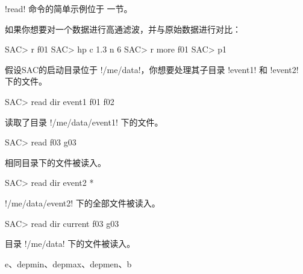!read! 命令的简单示例位于 一节。

如果你想要对一个数据进行高通滤波，并与原始数据进行对比：
\begin{SACCode}
SAC> r f01
SAC> hp c 1.3 n 6
SAC> r more f01
SAC> p1
\end{SACCode}

假设SAC的启动目录位于 !/me/data!，你想要处理其子目录 !event1!
和 !event2! 下的文件。
\begin{SACCode}
SAC> read dir event1 f01 f02
\end{SACCode}
读取了目录 !/me/data/event1! 下的文件。

\begin{SACCode}
SAC> read f03 g03
\end{SACCode}
相同目录下的文件被读入。

\begin{SACCode}
SAC> read dir event2 *
\end{SACCode}
!/me/data/event2! 下的全部文件被读入。

\begin{SACCode}
SAC> read dir current f03 g03
\end{SACCode}
目录 !/me/data! 下的文件被读入。

e、depmin、depmax、depmen、b
